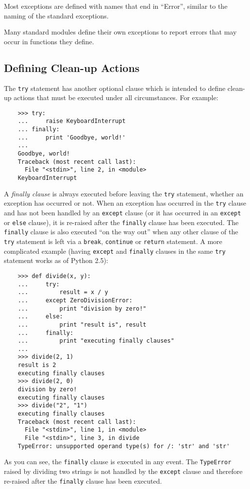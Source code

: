 \documentclass[UTF8]{article}
\begin{document}
Most exceptions are defined with names that end in ``Error'', similar to the naming of the standard
exceptions.

Many standard modules define their own exceptions to report errors that may occur in functions they
define.

\subsection{Defining Clean-up Actions}
The \texttt{try} statement has another optional clause which is intended to define clean-up actions
that must be executed under all circumstances. For example:
\begin{verbatim}
    >>> try:
    ...     raise KeyboardInterrupt
    ... finally:
    ...     print 'Goodbye, world!'
    ...
    Goodbye, world!
    Traceback (most recent call last):
      File "<stdin>", line 2, in <module>
    KeyboardInterrupt
\end{verbatim}

A \emph{finally clause} is always executed before leaving the \texttt{try} statement, whether an
exception has occurred or not. When an exception has occurred in the \texttt{try} clause and has
not been handled by an \texttt{except} clause (or it has occurred in an \texttt{except} or
\texttt{else} clause), it is re-raised after the \texttt{finally} clause has been executed. The
\texttt{finally} clause is also executed ``on the way out'' when any other clause of the
\texttt{try} statement is left via a \texttt{break}, \texttt{continue} or \texttt{return} statement.
A more complicated example (having \texttt{except} and \texttt{finally} clauses in the same
\texttt{try} statement works as of Python 2.5):
\begin{verbatim}
    >>> def divide(x, y):
    ...     try:
    ...         result = x / y
    ...     except ZeroDivisionError:
    ...         print "division by zero!"
    ...     else:
    ...         print "result is", result
    ...     finally:
    ...         print "executing finally clauses"
    ...
    >>> divide(2, 1)
    result is 2
    executing finally clauses
    >>> divide(2, 0)
    division by zero!
    executing finally clauses
    >>> divide("2", "1")
    executing finally clauses
    Traceback (most recent call last):
      File "<stdin>", line 1, in <module>
      File "<stdin>", line 3, in divide
    TypeError: unsupported operand type(s) for /: 'str' and 'str'
\end{verbatim}

As you can see, the \texttt{finally} clause is executed in any event. The \texttt{TypeError} raised
by dividing two strings is not handled by the \texttt{except} clause and therefore re-raised after
the \texttt{finally} clause has been executed.
\end{document}
